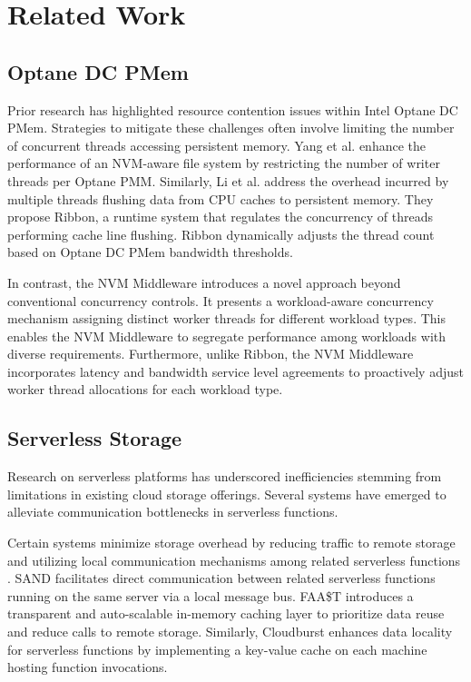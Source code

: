 \chapter{Related Work}

\section*{Optane DC PMem}

Prior research has highlighted resource contention issues within Intel Optane DC PMem. Strategies to mitigate these challenges often involve limiting the number of concurrent threads accessing persistent memory. Yang et al. \cite{yang2020empirical} enhance the performance of an NVM-aware file system by restricting the number of writer threads per Optane PMM. Similarly, Li et al. address the overhead incurred by multiple threads flushing data from CPU caches to persistent memory. They propose Ribbon, a runtime system that regulates the concurrency of threads performing cache line flushing. Ribbon dynamically adjusts the thread count based on Optane DC PMem bandwidth thresholds.

In contrast, the NVM Middleware introduces a novel approach beyond conventional concurrency controls. It presents a workload-aware concurrency mechanism assigning distinct worker threads for different workload types. This enables the NVM Middleware to segregate performance among workloads with diverse requirements. Furthermore, unlike Ribbon, the NVM Middleware incorporates latency and bandwidth service level agreements to proactively adjust worker thread allocations for each workload type.

\section*{Serverless Storage}

Research on serverless platforms has underscored inefficiencies stemming from limitations in existing cloud storage offerings. Several systems have emerged to alleviate communication bottlenecks in serverless functions.

Certain systems minimize storage overhead by reducing traffic to remote storage and utilizing local communication mechanisms among related serverless functions \cite{akkus2018sand,romero2021faat}. SAND \cite{akkus2018sand} facilitates direct communication between related serverless functions running on the same server via a local message bus. FAA\$T \cite{romero2021faat} introduces a transparent and auto-scalable in-memory caching layer to prioritize data reuse and reduce calls to remote storage. Similarly, Cloudburst \cite{Sreekanti_2020} enhances data locality for serverless functions by implementing a key-value cache on each machine hosting function invocations.

